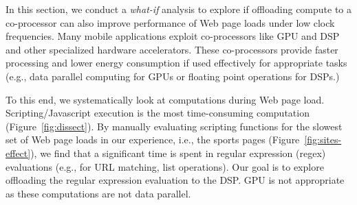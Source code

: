 In this section, we conduct a {\em what-if} analysis to explore if offloading compute to a co-processor can also improve performance of Web page loads under low clock frequencies. Many mobile applications exploit co-processors like GPU and DSP and other specialized hardware accelerators. These co-processors provide faster processing and lower energy consumption if used effectively for appropriate
tasks (e.g., data parallel computing
for GPUs or floating point operations for DSPs.)
 





To this end, we systematically look at computations during
Web page load. Scripting/Javascript execution is the most
time-consuming computation (Figure~\ref{fig:dissect}). By manually
evaluating scripting functions
for the slowest set of Web page loads in our experience, i.e., the sports
pages (Figure~\ref{fig:sites-effect}), we find 
that a significant time is spent in regular 
expression (regex) evaluations (e.g., for 
URL matching, list operations). Our goal is to explore offloading the regular expression evaluation to the DSP. GPU is not appropriate as these computations are not data parallel.

